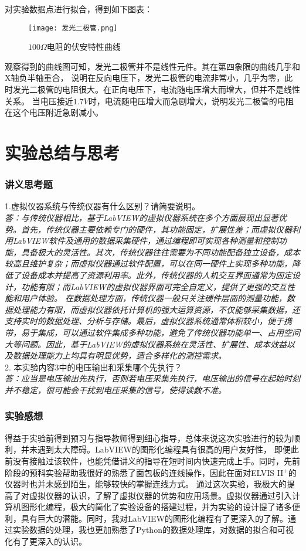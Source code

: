 \documentclass[UTF-8,twoside,cs4size]{ctexart}
\begin{document}
            对实验数据点进行拟合，得到如下图表：
            \begin{figure}[!h]
                \centering
                \texttt{[image: 发光二极管.png]}
                \caption{$100\Omega$电阻的伏安特性曲线}
            \end{figure}
            观察得到的曲线图可知，发光二极管并不是线性元件。其在第四象限的曲线几乎和X轴负半轴重合，
            说明在反向电压下，发光二极管的电流非常小，几乎为零，此时发光二极管的电阻很大。在正向电压下，电流随电压增大而增大，但并不是线性关系。
            当电压接近$1.7V$时，电流随电压增大而急剧增大，说明发光二极管的电阻在这个电压附近急剧减小。
\section{实验总结与思考}
    \subsubsection{讲义思考题}
    1.虚拟仪器系统与传统仪器有什么区别？请简要说明。 \\
    \textit{答：与传统仪器相比，基于LabVIEW的虚拟仪器系统在多个方面展现出显著优势。首先，传统仪器主要依赖专门的硬件，其功能固定，扩展性差；而虚拟仪器利用LabVIEW软件及通用的数据采集硬件，通过编程即可实现各种测量和控制功能，具备极大的灵活性。其次，传统仪器往往需要为不同功能配备独立设备，成本较高且维护复杂；而虚拟仪器通过软件配置，可以在同一硬件上实现多种功能，降低了设备成本并提高了资源利用率。此外，传统仪器的人机交互界面通常为固定设计，功能有限；而LabVIEW的虚拟仪器界面可完全自定义，提供了更强的交互性能和用户体验。
    在数据处理方面，传统仪器一般只关注硬件层面的测量功能，数据处理能力有限，而虚拟仪器依托计算机的强大运算资源，不仅能够采集数据，还支持实时的数据处理、分析与存储。最后，虚拟仪器系统通常体积较小，便于携带，易于集成，可以通过软件集成多种功能，避免了传统仪器功能单一、占用空间大等问题。因此，基于LabVIEW的虚拟仪器系统在灵活性、扩展性、成本效益以及数据处理能力上均具有明显优势，适合多样化的测控需求。}  \\
    2. 本实验内容3中的电压输出和采集哪个先执行？  \\
    \textit{答：应当是电压输出先执行，否则若电压采集先执行，电压输出的信号在起始时刻并不稳定，很可能会干扰到电压采集的信号，使得读数不准。} \\
    \subsubsection{实验感想}
    得益于实验前得到预习与指导教师得到细心指导，总体来说这次实验进行的较为顺利，并未遇到太大障碍。LabVIEW的图形化编程具有很高的用户友好性，
    即便此前没有接触过该软件，也能凭借讲义的指导在短时间内快速完成上手。同时，先前阶段的预科实验帮助我很好的熟悉了面包板的连线操作，因此在面对ELVIS II$ ^+ $的仪器时也并未感到陌生，能够较快的掌握连线方式。
    通过这次实验，我极大的提高了对虚拟仪器的认识，了解了虚拟仪器的优势和应用场景。虚拟仪器通过引入计算机图形化编程，极大的简化了实验设备的搭建过程，并为实验的设计提了诸多便利，具有巨大的潜能。同时，我对LabVIEW的图形化编程有了更深入的了解。通过实验数据的处理，我也更加熟悉了Python的数据处理库，对数据的拟合和可视化有了更深入的认识。
\end{document}
